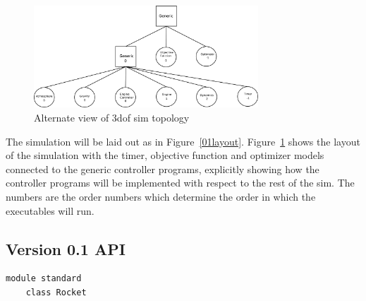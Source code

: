 \documentclass{article}
\begin{document}
\begin{figure}[h]
\begin{center}
\leavevmode
\includegraphics[width=0.75\textwidth]{01layoutalt.pdf}
\end{center}
\caption{Alternate view of 3dof sim topology}
\label{01layout_alt}
\end{figure}

The simulation will be laid out as in Figure~\ref{01layout}. Figure~\ref{01layout_alt} shows the layout of the simulation with the timer, objective function and optimizer models connected to the generic controller programs, explicitly showing how the controller programs will be implemented with respect to the rest of the sim. The numbers are the order numbers which determine the order in which the executables will run.

\subsection{Version 0.1 API}
\begin{verbatim}
module standard
    class Rocket
\end{verbatim}
\end{document}
